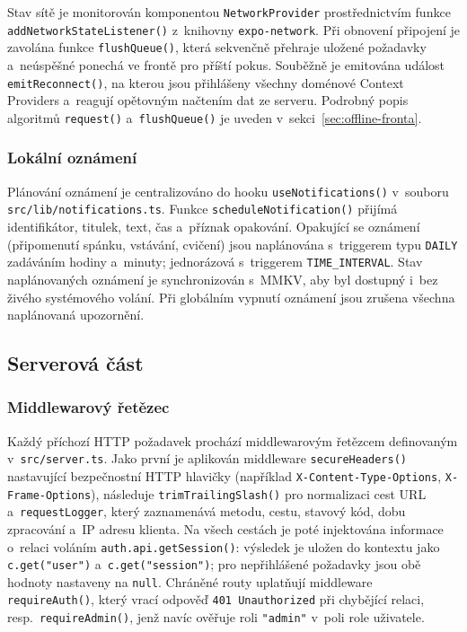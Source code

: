 {\sloppy
Stav sítě je monitorován komponentou \texttt{NetworkProvider}
prostřednictvím funkce \texttt{addNetworkState\-Listener()} z~knihovny
\texttt{expo-network}. Při obnovení připojení je zavolána funkce
\texttt{flushQueue()}, která sekvenčně přehraje uložené požadavky
a~neúspěšné ponechá ve frontě pro příští pokus. Souběžně je emitována
událost \texttt{emitReconnect()}, na kterou jsou přihlášeny všechny
doménové Context Providers a~reagují opětovným načtením dat ze serveru.
Podrobný popis algoritmů \texttt{request()} a~\texttt{flushQueue()} je
uveden v~sekci~\ref{sec:offline-fronta}.
}

\subsubsection{Lokální oznámení}

Plánování oznámení je centralizováno do hooku \texttt{useNotifications()}
v~souboru \texttt{src/lib/}\allowbreak\texttt{notifications.ts}. Funkce
\texttt{scheduleNotification()}
přijímá identifikátor, titulek, text, čas a~příznak opakování. Opakující
se oznámení (připomenutí spánku, vstávání, cvičení) jsou naplánována
s~triggerem typu \texttt{DAILY} zadáváním hodiny a~minuty; jednorázová
s~triggerem \texttt{TIME\_INTERVAL}. Stav naplánovaných oznámení je
synchronizován s~MMKV, aby byl dostupný i~bez živého systémového volání.
Při globálním vypnutí oznámení jsou zrušena všechna naplánovaná upozornění.

\subsection{Serverová část}

\subsubsection{Middlewarový řetězec}

Každý příchozí HTTP požadavek prochází middlewarovým řetězcem definovaným
v~\texttt{src/server.ts}. Jako první je aplikován middleware
\texttt{secureHeaders()} nastavující bezpečnostní HTTP hlavičky
(například \texttt{X-Content-Type-Options}, \texttt{X-Frame-Options}),
následuje \texttt{trimTrailingSlash()} pro normalizaci cest URL
a~\texttt{requestLogger}, který zaznamenává metodu, cestu, stavový kód,
dobu zpracování a~IP adresu klienta. Na všech cestách je poté injektována
informace o~relaci voláním \texttt{auth.api.getSession()}: výsledek
je uložen do kontextu jako \texttt{c.get("user")} a~\texttt{c.get("session")};
pro nepřihlášené požadavky jsou obě hodnoty nastaveny na \texttt{null}.
Chráněné routy uplatňují middleware \texttt{requireAuth()}, který vrací
odpověď \texttt{401~Unauthorized} při chybějící relaci, resp.\
\texttt{requireAdmin()}, jenž navíc ověřuje roli \texttt{"admin"} v~poli
role uživatele.

